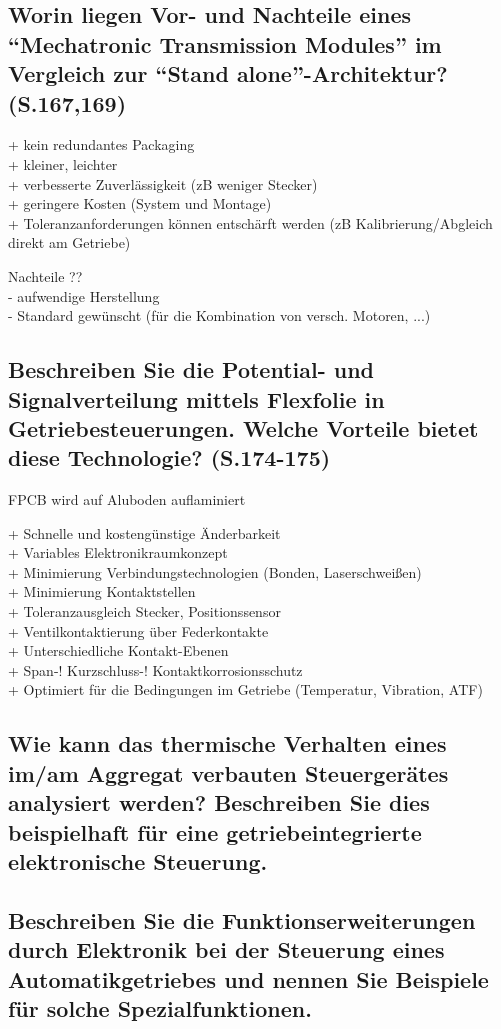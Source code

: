 \subsection{Worin liegen Vor- und Nachteile eines ``Mechatronic Transmission Modules'' im Vergleich zur ``Stand alone''-Architektur? (S.167,169)}
+ kein redundantes Packaging \\
+ kleiner, leichter \\
+ verbesserte Zuverlässigkeit (zB weniger Stecker) \\
+ geringere Kosten (System und Montage) \\
+ Toleranzanforderungen können entschärft werden (zB Kalibrierung/Abgleich direkt am Getriebe)

Nachteile ?? \\
- aufwendige Herstellung \\
- Standard gewünscht (für die Kombination von versch. Motoren, ...)

\subsection{Beschreiben Sie die Potential- und Signalverteilung mittels Flexfolie in Getriebesteuerungen. Welche Vorteile bietet diese Technologie? (S.174-175)}
FPCB wird auf Aluboden auflaminiert

+ Schnelle und kostengünstige Änderbarkeit \\
+ Variables Elektronikraumkonzept \\
+ Minimierung Verbindungstechnologien (Bonden, Laserschweißen) \\
+ Minimierung Kontaktstellen \\
+ Toleranzausgleich Stecker, Positionssensor \\
+ Ventilkontaktierung über Federkontakte \\
+ Unterschiedliche Kontakt-Ebenen \\
+ Span-! Kurzschluss-! Kontaktkorrosionsschutz \\
+ Optimiert für die Bedingungen im Getriebe (Temperatur, Vibration, ATF)

\subsection{Wie kann das thermische Verhalten eines im/am Aggregat verbauten Steuerger\"ates analysiert werden? Beschreiben Sie dies beispielhaft f\"ur eine getriebeintegrierte elektronische Steuerung.}

\subsection{Beschreiben Sie die Funktionserweiterungen durch Elektronik bei der Steuerung eines Automatikgetriebes und nennen Sie Beispiele f\"ur solche Spezialfunktionen.}
